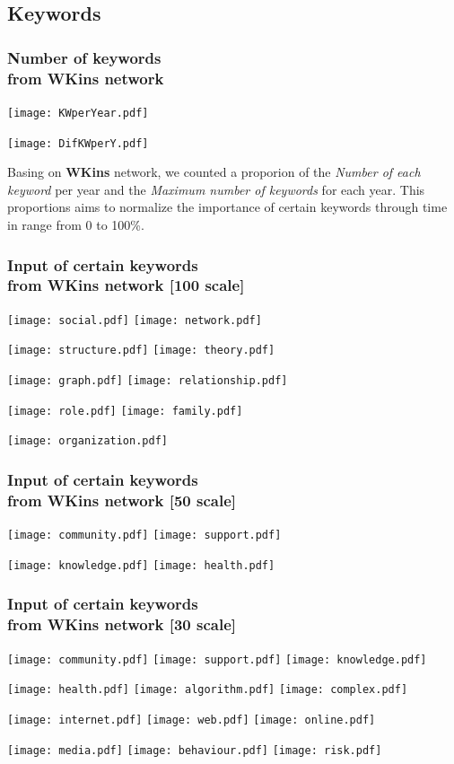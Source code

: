 \documentclass[hyperref={pdfstartview={FitBH -32768},
                         pdfpagemode=FullScreen,
                         plainpages=false,
                         colorlinks=true}
              ]{beamer}
\begin{document}
\subsection{Keywords}
\begin{frame}[fragile]
\frametitle{Number of keywords \\ \normalsize from WKins network }
\centerline{
\texttt{[image: KWperYear.pdf]}}
\centerline{
\texttt{[image: DifKWperY.pdf]}}

\small
Basing on \textbf{WKins} network, we counted a proporion of the \textit{Number of each keyword} per year and the \textit{Maximum number of keywords} for each year. This proportions aims to normalize the importance of certain keywords through time in range from 0 to 100\%. 
\end{frame}     

\begin{frame}[fragile]
\frametitle{Input of certain keywords \\ \normalsize from WKins network [100 scale] }
\centerline{
\texttt{[image: social.pdf]} 
\texttt{[image: network.pdf]}}
\centerline{
\texttt{[image: structure.pdf]}
\texttt{[image: theory.pdf]}}
\centerline{
\texttt{[image: graph.pdf]} 
\texttt{[image: relationship.pdf]}} 
\centerline{
\texttt{[image: role.pdf]} 
\texttt{[image: family.pdf]}}
\centerline{
\texttt{[image: organization.pdf]}} 
\end{frame}     

\begin{frame}[fragile]
\frametitle{Input of certain keywords  \\ \normalsize from WKins network [50 scale] }
\centerline{
\texttt{[image: community.pdf]} 
\texttt{[image: support.pdf]}}
\centerline{
\texttt{[image: knowledge.pdf]} 
\texttt{[image: health.pdf]}} 
\end{frame}     


\begin{frame}[fragile]
\frametitle{Input of certain keywords  \\ \normalsize from WKins network [30 scale] }
\centerline{
\texttt{[image: community.pdf]} 
\texttt{[image: support.pdf]}
\texttt{[image: knowledge.pdf]}}
\centerline{
\texttt{[image: health.pdf]}
\texttt{[image: algorithm.pdf]} 
\texttt{[image: complex.pdf]}}
\centerline{
\texttt{[image: internet.pdf]}
\texttt{[image: web.pdf]}
\texttt{[image: online.pdf]}}
\centerline{
\texttt{[image: media.pdf]}
\texttt{[image: behaviour.pdf]}
\texttt{[image: risk.pdf]}} 
\end{frame}     
\end{document}
